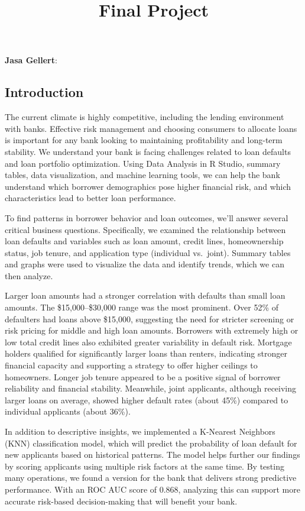 \documentclass[
]{article}
\title{Final Project}
\author{}
\date{\vspace{-2.5em}}
\begin{document}
\maketitle

\textbf{Jasa Gellert}:

\subsection{Introduction}\label{introduction}

The current climate is highly competitive, including the lending
environment with banks. Effective risk management and choosing consumers
to allocate loans is important for any bank looking to maintaining
profitability and long-term stability. We understand your bank is facing
challenges related to loan defaults and loan portfolio optimization.
Using Data Analysis in R Studio, summary tables, data visualization, and
machine learning tools, we can help the bank understand which borrower
demographics pose higher financial risk, and which characteristics lead
to better loan performance.

To find patterns in borrower behavior and loan outcomes, we'll answer
several critical business questions. Specifically, we examined the
relationship between loan defaults and variables such as loan amount,
credit lines, homeownership status, job tenure, and application type
(individual vs.~joint). Summary tables and graphs were used to visualize
the data and identify trends, which we can then analyze.

Larger loan amounts had a stronger correlation with defaults than small
loan amounts. The \$15,000--\$30,000 range was the most prominent. Over
52\% of defaulters had loans above \$15,000, suggesting the need for
stricter screening or risk pricing for middle and high loan amounts.
Borrowers with extremely high or low total credit lines also exhibited
greater variability in default risk. Mortgage holders qualified for
significantly larger loans than renters, indicating stronger financial
capacity and supporting a strategy to offer higher ceilings to
homeowners. Longer job tenure appeared to be a positive signal of
borrower reliability and financial stability. Meanwhile, joint
applicants, although receiving larger loans on average, showed higher
default rates (about 45\%) compared to individual applicants (about
36\%).

In addition to descriptive insights, we implemented a K-Nearest
Neighbors (KNN) classification model, which will predict the probability
of loan default for new applicants based on historical patterns. The
model helps further our findings by scoring applicants using multiple
risk factors at the same time. By testing many operations, we found a
version for the bank that delivers strong predictive performance. With
an ROC AUC score of 0.868, analyzing this can support more accurate
risk-based decision-making that will benefit your bank.
\end{document}
